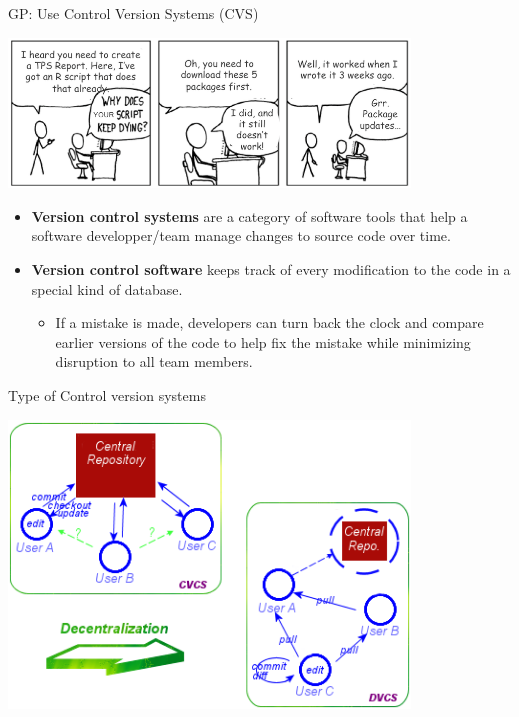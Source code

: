 \documentclass[ignorenonframetext,]{beamer}
\providecommand{\tightlist}{%
  \setlength{\itemsep}{0pt}\setlength{\parskip}{0pt}}
\begin{document}
\begin{frame}{%
\protect\hypertarget{gp-use-control-version-systems-cvs}{%
GP: Use Control Version Systems (CVS)}}

\begin{center}
\includegraphics[width=0.8\textwidth]{"images/whyWeNeedCVS"}
\end{center}

\begin{itemize}
\tightlist
\item
  \textbf{Version control systems} are a category of software tools that
  help a software developper/team manage changes to source code over
  time.
\item
  \textbf{Version control software} keeps track of every modification to
  the code in a special kind of database.

  \begin{itemize}
  \tightlist
  \item
    If a mistake is made, developers can turn back the clock and compare
    earlier versions of the code to help fix the mistake while
    minimizing disruption to all team members.
  \end{itemize}
\end{itemize}

\end{frame}

\begin{frame}{%
\protect\hypertarget{type-of-control-version-systems}{%
Type of Control version systems}}

\begin{center}
\includegraphics[width=0.8\textwidth]{"images/ccvs-dcvs"}
\end{center}

\end{frame}
\end{document}
